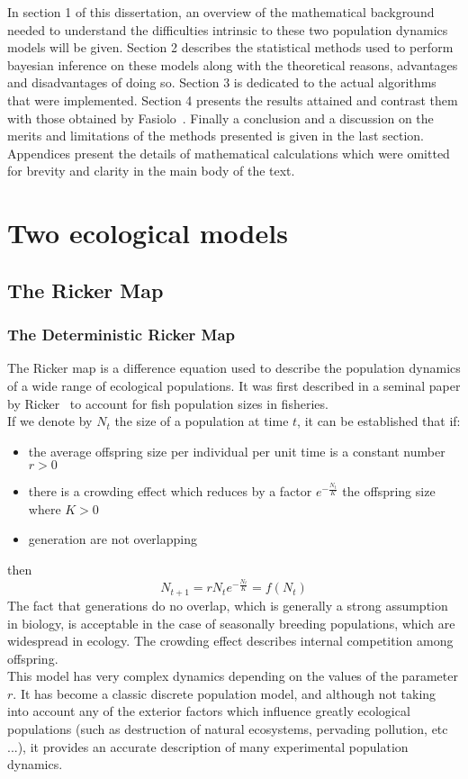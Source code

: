\documentclass[12pt]{article}
\begin{document}
	In section 1 of this dissertation, an overview of the mathematical background needed to understand the difficulties intrinsic to these two population dynamics models will be given. Section 2 describes the statistical methods used to perform bayesian inference on these models along with the theoretical reasons, advantages and disadvantages of doing so. Section 3 is dedicated to the actual algorithms that were implemented. Section 4 presents the results attained and contrast them with those obtained by Fasiolo~\cite{fasiolo2014statistical}. Finally a conclusion and a discussion on the merits and limitations of the methods presented is given in the last section. Appendices present the details of mathematical calculations which were omitted for brevity and clarity in the main body of the text.
	
	\clearpage
	\section{Two ecological models}
	\subsection{The Ricker Map}  \label{rickerGen}
	\subsubsection{The Deterministic Ricker Map}
	The Ricker map is a difference equation used to describe the population dynamics of a wide range of ecological populations. It was first described in a seminal paper by Ricker~\cite{Ricker1954} to account for fish population sizes in fisheries. \\
	If we denote by $N_t$ the size of a population at time $t$, it can be established that if:
	\begin{itemize}
	\item the average offspring size per individual per unit time is a constant number $r > 0$
	\item there is a crowding effect which reduces by a factor $e^{-\frac{N_t}{K}}$ the offspring size where $K > 0$
	\item generation are not overlapping
	\end{itemize}
	then 
	\begin{equation}
		N_{t+1} = r N_t e^{-\frac{N_t}{K}} = f(N_t)
		\label{eq:ricker}
	\end{equation}
	The fact that generations do no overlap, which is generally a strong assumption in biology, is acceptable in the case of seasonally breeding populations, which are widespread in ecology. The crowding effect describes internal competition among offspring. \\
	This model has very complex dynamics depending on the values of the parameter $r$. It has become a classic discrete population model, and although not taking into account any of the exterior factors which influence greatly ecological populations (such as destruction of natural ecosystems, pervading pollution, etc ...), it provides an accurate description of many experimental population dynamics.
	
\end{document}
